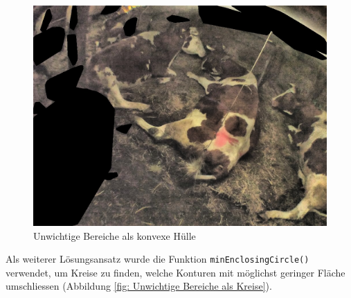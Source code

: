 \begin{figure}[H]
	\center
	\includegraphics[scale=0.43]{Grafiken/entwicklung/7unwichtigeKonvexe.jpg}
	\caption{Unwichtige Bereiche als konvexe Hülle} 
	\label{fig: Unwichtige Bereiche als konvexe Hülle}
\end{figure}

 Als weiterer Lösungsansatz wurde die Funktion \texttt{minEnclosingCircle()} verwendet, um Kreise zu finden, welche Konturen mit möglichst geringer Fläche umschliessen (Abbildung \ref{fig: Unwichtige Bereiche als Kreise}).
 
